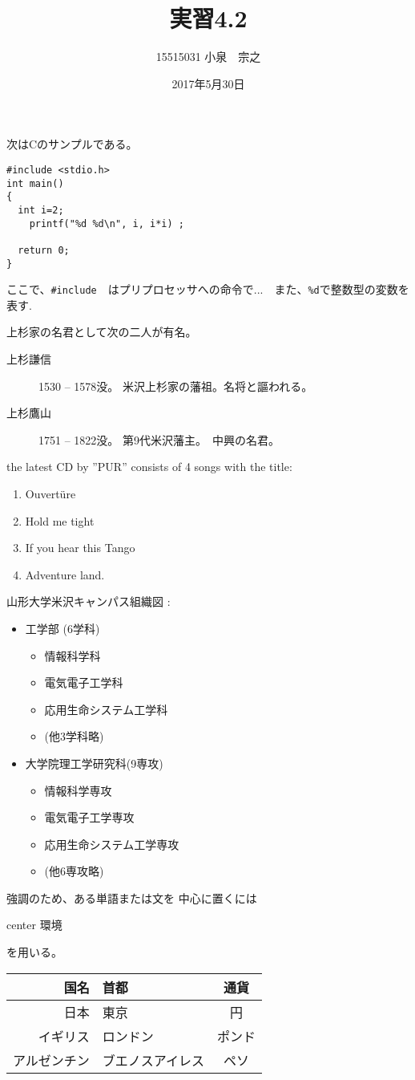 \documentclass[12pt,a4j]{jarticle}
\title{実習4.2}
\author{15515031 小泉　宗之}
\date{2017年5月30日}
\begin{document}
\maketitle

次はCのサンプルである。
\begin{verbatim}
#include <stdio.h>
int main()
{
  int i=2;
    printf("%d %d\n", i, i*i) ;

  return 0;
}
\end{verbatim}
ここで、\verb|#include|　はプリプロセッサへの命令で...　また、\verb+%d+で整数型の変数を表す.

上杉家の名君として次の二人が有名。
\begin{description}
\item[上杉謙信] 1530 -- 1578没。
米沢上杉家の藩祖。名将と謳われる。
\item[上杉鷹山] 1751 -- 1822没。
第9代米沢藩主。　中興の名君。
\end{description}

the latest CD by ''PUR'' consists of 4 songs with the title:
\begin{enumerate}
\item Ouvert\"ure
\item Hold me tight
\item If you hear this Tango
\item Adventure land.
\end{enumerate}

山形大学米沢キャンパス組織図 :
\begin{itemize}
\item 工学部 (6学科)
 \begin{itemize}
 \item 情報科学科
 \item 電気電子工学科
 \item 応用生命システム工学科
 \item (他3学科略)
 \end{itemize}
\item 大学院理工学研究科(9専攻)
 \begin{itemize}
 \item 情報科学専攻
 \item 電気電子工学専攻
 \item 応用生命システム工学専攻
 \item (他6専攻略)
 \end{itemize}
\end{itemize}

強調のため、ある単語または文を
中心に置くには
\begin{center}
center 環境
\end{center}
を用いる。

\begin{center}
\begin{tabular}{r|lc}
\hline
国名 & 首都 & 通貨 \\
\hline
日本 & 東京 & 円 \\
イギリス & ロンドン & ポンド \\
アルゼンチン&ブエノスアイレス&ペソ\\
\hline
\end{tabular}
\end{center}
\end{document}
